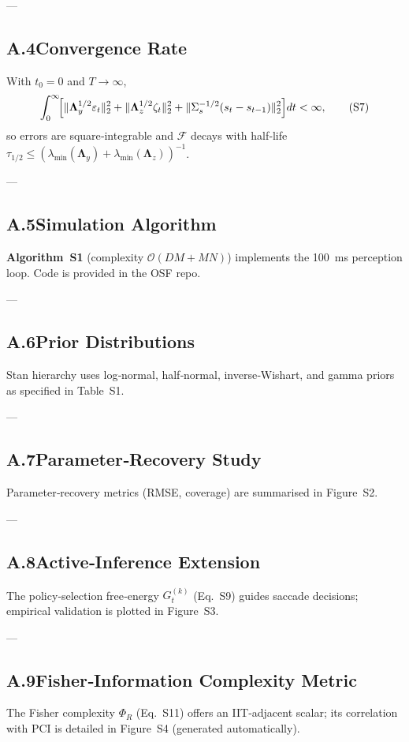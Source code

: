 \documentclass[12pt]{article}
\begin{document}
---
\subsection*{A.4\quad Convergence Rate}
With $t_0=0$ and $T\!\to\!\infty$,
\begin{equation}
\int_0^{\infty}\!\Bigl[\lVert\boldsymbol\Lambda_y^{1/2}\varepsilon_t\rVert_2^2+\lVert\boldsymbol\Lambda_z^{1/2}\zeta_t\rVert_2^2+\lVert\Sigma_s^{-1/2}(s_t-s_{t-1})\rVert_2^2\Bigr]dt<\infty,\tag{S7}
\end{equation}
so errors are square‑integrable and $\mathcal F$ decays with half‑life $\tau_{1/2}\le(\lambda_{\min}(\boldsymbol\Lambda_y)+\lambda_{\min}(\boldsymbol\Lambda_z))^{-1}$.

---
\subsection*{A.5\quad Simulation Algorithm}
\textbf{Algorithm S1} (complexity $\mathcal O(DM+MN)$) implements the 100 ms perception loop. Code is provided in the OSF repo.

---
\subsection*{A.6\quad Prior Distributions}
Stan hierarchy uses log‑normal, half‑normal, inverse‑Wishart, and gamma priors as specified in Table~S1.

---
\subsection*{A.7\quad Parameter‑Recovery Study}
Parameter‑recovery metrics (RMSE, coverage) are summarised in Figure S2.

---
\subsection*{A.8\quad Active‑Inference Extension}
The policy‑selection free‑energy $G_t^{(k)}$ (Eq.~S9) guides saccade decisions; empirical validation is plotted in Figure S3.

---
\subsection*{A.9\quad Fisher‑Information Complexity Metric}
The Fisher complexity $\Phi_R$ (Eq.~S11) offers an IIT‑adjacent scalar; its correlation with PCI is detailed in Figure S4 (generated automatically).
\end{document}
